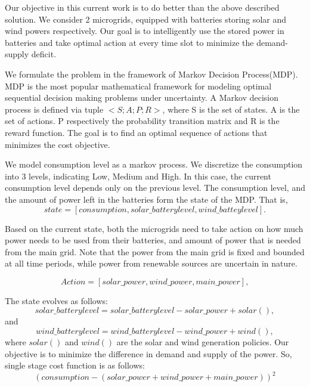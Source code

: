 \documentclass[conference]{IEEEtran}
\begin{document}
Our objective in this current work is to do better than the above described solution. We consider 2 microgrids, equipped with batteries storing solar and wind powers respectively. Our goal is to intelligently use the stored power in batteries and take optimal action at every time slot to minimize the demand-supply deficit.

We formulate the problem in the framework of Markov Decision Process(MDP). MDP is the most popular mathematical framework for modeling optimal sequential decision making problems under uncertainty. A Markov decision process is defined via tuple $< S; A; P;R >$, where S is the set of states. A is the set of actions. P respectively the probability transition matrix and R is
the reward function. The goal is to find an optimal sequence of actions that minimizes the cost objective. 

We model consumption level as a markov process. We discretize the consumption into 3 levels, indicating Low, Medium and High. In this case, the current consumption level depends only on the previous level. The consumption level, and the amount of power left in the batteries form the state of the MDP. That is, 
\begin{equation}
 state = [consumption, solar\_batterylevel, wind\_batteylevel].
\end{equation}

Based on the current state, both the microgrids need to take action on how much power needs to be used from their batteries, and amount of power that is needed from the main grid. Note that the power from the main grid is fixed and bounded at all time periods, while power from renewable sources are uncertain in nature. 

\begin{equation}
Action = [solar\_power,wind\_power,main\_power],
\end{equation}

The state evolves as follows:
\begin{equation}
solar\_batterylevel = solar\_batterylevel - solar\_power + solar(), 
\end{equation}
and
\begin{equation}
wind\_batterylevel = wind\_batterylevel - wind\_power + wind(),
\end{equation}
where
$solar()$ and $wind()$ are the solar and wind generation policies. 
Our objective is to minimize the difference in demand and supply of the power. So, single stage cost function is as follows:
$$(consumption - (solar\_power+wind\_power+main\_power))^2$$
\end{document}
